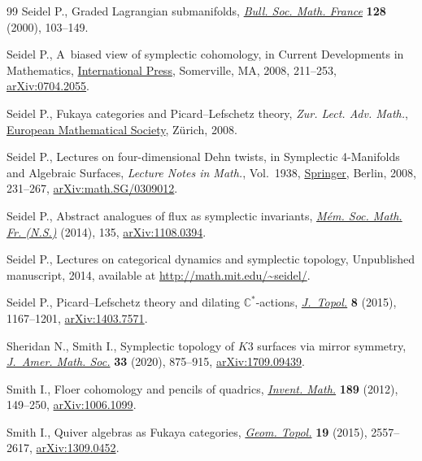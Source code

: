 \documentclass[10pt,a4paper]{amsart}
\theoremstyle{definition}
\numberwithin{equation}{section}
\begin{document}
\begin{thebibliography}{99}
Seidel P., Graded {L}agrangian submanifolds,
 \href{https://doi.org/10.24033/bsmf.2365}{\textit{Bull. Soc. Math. France}}
 \textbf{128} (2000), 103--149.

Seidel P., A~biased view of symplectic cohomology, in Current Developments in
 Mathematics,
 \href{https://doi.org/10.4310/CDM.2006.v2006.n1.a4}{International Press},
 Somerville, MA, 2008, 211--253,
 \href{http://arxiv.org/abs/0704.2055}{arXiv:0704.2055}.

Seidel P., Fukaya categories and {P}icard--{L}efschetz theory, \textit{Zur. Lect. Adv.
 Math.}, \href{https://doi.org/10.4171/063}{European Mathematical Society},
 Z\"urich, 2008.

Seidel P., Lectures on four-dimensional {D}ehn twists, in Symplectic
 4-Manifolds and Algebraic Surfaces, \textit{Lecture Notes in Math.}, Vol.~1938, \href{https://doi.org/10.1007/978-3-540-78279-7_4}{Springer}, Berlin,
 2008, 231--267,
 \href{http://arxiv.org/abs/math.SG/0309012}{arXiv:math.SG/0309012}.

Seidel P., Abstract analogues of flux as symplectic invariants,
 \href{https://doi.org/10.24033/msmf.447}{\textit{M\'em. Soc. Math. Fr.
 (N.S.)}} (2014), 135,
 \href{http://arxiv.org/abs/1108.0394}{arXiv:1108.0394}.

Seidel P., Lectures on categorical dynamics and symplectic topology,
 {U}npublished manuscript, 2014, available at
 \url{http://math.mit.edu/~seidel/}.

Seidel P., Picard--{L}efschetz theory and dilating {$\mathbb{C}^*$}-actions,
 \href{https://doi.org/10.1112/jtopol/jtv029}{\textit{J.~Topol.}} \textbf{8}
 (2015), 1167--1201, \href{http://arxiv.org/abs/1403.7571}{arXiv:1403.7571}.

Sheridan N., Smith I., Symplectic topology of {$K3$} surfaces via mirror
 symmetry, \href{https://doi.org/10.1090/jams/946}{\textit{J.~Amer. Math.
 Soc.}} \textbf{33} (2020), 875--915,
 \href{http://arxiv.org/abs/1709.09439}{arXiv:1709.09439}.

Smith I., Floer cohomology and pencils of quadrics,
 \href{https://doi.org/10.1007/s00222-011-0364-1}{\textit{Invent. Math.}}
 \textbf{189} (2012), 149--250,
 \href{http://arxiv.org/abs/1006.1099}{arXiv:1006.1099}.

Smith I., Quiver algebras as {F}ukaya categories,
 \href{https://doi.org/10.2140/gt.2015.19.2557}{\textit{Geom. Topol.}}
 \textbf{19} (2015), 2557--2617,
 \href{http://arxiv.org/abs/1309.0452}{arXiv:1309.0452}.


\end{thebibliography}
\end{document}
